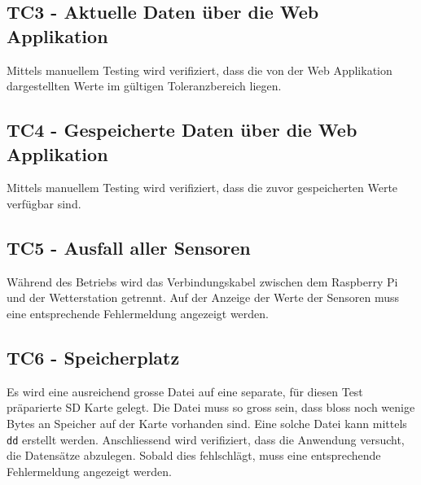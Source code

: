 \documentclass[
    10pt,
    a4paper,
]{scrartcl}
\begin{document}
\subsection{TC3 - Aktuelle Daten über die Web Applikation}
Mittels manuellem Testing wird verifiziert, dass die von der Web Applikation dargestellten
Werte im gültigen Toleranzbereich liegen.

\subsection{TC4 - Gespeicherte Daten über die Web Applikation}
Mittels manuellem Testing wird verifiziert, dass die zuvor gespeicherten Werte verfügbar
sind.

\subsection{TC5 - Ausfall aller Sensoren}
Während des Betriebs wird das Verbindungskabel zwischen dem Raspberry Pi und der
Wetterstation getrennt. Auf der Anzeige der Werte der Sensoren muss eine entsprechende
Fehlermeldung angezeigt werden.

\subsection{TC6 - Speicherplatz}
Es wird eine ausreichend grosse Datei auf eine separate, für diesen Test präparierte SD
Karte gelegt. Die Datei muss so gross sein, dass bloss noch wenige Bytes an Speicher auf
der Karte vorhanden sind. Eine solche Datei kann mittels \texttt{dd} erstellt werden.
Anschliessend wird verifiziert, dass die Anwendung versucht, die Datensätze abzulegen.
Sobald dies fehlschlägt, muss eine entsprechende Fehlermeldung angezeigt werden.



\listoffigures



\end{document}
